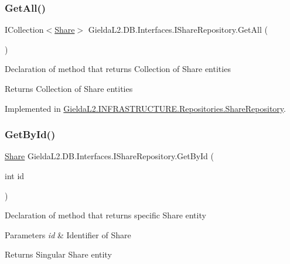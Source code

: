 \subsubsection{\texorpdfstring{GetAll()}{GetAll()}}
{\footnotesize\ttfamily I\+Collection$<$\mbox{\hyperlink{class_gielda_l2_1_1_d_b_1_1_entities_1_1_share}{Share}}$>$ Gielda\+L2.\+D\+B.\+Interfaces.\+I\+Share\+Repository.\+Get\+All (\begin{DoxyParamCaption}{ }\end{DoxyParamCaption})}



Declaration of method that returns Collection of Share entities 

\begin{DoxyReturn}{Returns}
Collection of Share entities
\end{DoxyReturn}


Implemented in \mbox{\hyperlink{class_gielda_l2_1_1_i_n_f_r_a_s_t_r_u_c_t_u_r_e_1_1_repositories_1_1_share_repository_aef8271595f290092d8b99d4789c8f37c}{Gielda\+L2.\+I\+N\+F\+R\+A\+S\+T\+R\+U\+C\+T\+U\+R\+E.\+Repositories.\+Share\+Repository}}.

\mbox{\label{interface_gielda_l2_1_1_d_b_1_1_interfaces_1_1_i_share_repository_af252fb27ec646e120265e2f71c83677a}} 
\subsubsection{\texorpdfstring{GetById()}{GetById()}}
{\footnotesize\ttfamily \mbox{\hyperlink{class_gielda_l2_1_1_d_b_1_1_entities_1_1_share}{Share}} Gielda\+L2.\+D\+B.\+Interfaces.\+I\+Share\+Repository.\+Get\+By\+Id (\begin{DoxyParamCaption}\item[{int}]{id }\end{DoxyParamCaption})}





Declaration of method that returns specific Share entity


\begin{DoxyParams}{Parameters}
{\em id} & Identifier of Share\\
\hline
\end{DoxyParams}
\begin{DoxyReturn}{Returns}
Singular Share entity
\end{DoxyReturn}


